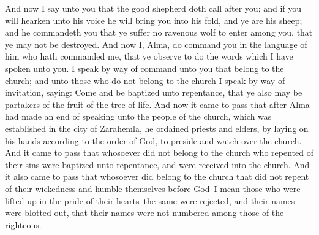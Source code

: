 And now I say unto you that the good shepherd doth call after you; and if you will hearken unto his voice he will bring you into his fold, and ye are his sheep; and he commandeth you that ye suffer no ravenous wolf to enter among you, that ye may not be destroyed.
\bverse \iffalse And now I, Alma, do command you in the language of him who hath commanded me, that ye observe to do the words which I have spoken unto you. \fi
And now I, Alma, do command you in the language of him who hath commanded me, that ye observe to do the words which I have spoken unto you.
\bverse \iffalse I speak by way of command unto you that belong to the church; and unto those who do not belong to the church I speak by way of invitation, saying: Come and be baptized unto repentance, that ye also may be partakers of the fruit of the tree of life. \fi
I speak by way of command unto you that belong to the church; and unto those who do not belong to the church I speak by way of invitation, saying: Come and be baptized unto repentance, that ye also may be partakers of the fruit of the tree of life.
\bchapter
\bverse \iffalse And now it came to pass that after Alma had made an end of speaking unto the people of the church, which was established in the city of Zarahemla, he ordained priests and elders, by laying on his hands according to the order of God, to preside and watch over the church. \fi
And now it came to pass that after Alma had made an end of speaking unto the people of the church, which was established in the city of Zarahemla, he ordained priests and elders, by laying on his hands according to the order of God, to preside and watch over the church.
\bverse \iffalse And it came to pass that whosoever did not belong to the church who repented of their sins were baptized unto repentance, and were received into the church. \fi
And it came to pass that whosoever did not belong to the church who repented of their sins were baptized unto repentance, and were received into the church.
\bverse \iffalse And it also came to pass that whosoever did belong to the church that did not repent of their wickedness and humble themselves before God--I mean those who were lifted up in the pride of their hearts--the same were rejected, and their names were blotted out, that their names were not numbered among those of the righteous. \fi
And it also came to pass that whosoever did belong to the church that did not repent of their wickedness and humble themselves before God--I mean those who were lifted up in the pride of their hearts--the same were rejected, and their names were blotted out, that their names were not numbered among those of the righteous.

